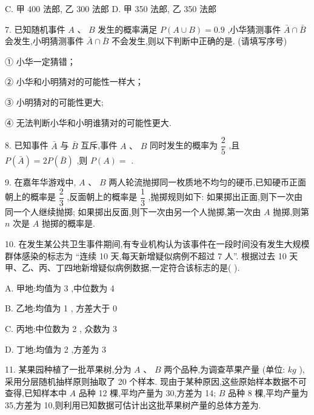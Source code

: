 C. 甲 400 法郎, 乙 300 法郎 D. 甲 350 法郎, 乙 350 法郎

7. 已知随机事件 $A\text{ 、 }B$ 发生的概率满足 $P\left( {A \cup  B}\right)  = {0.9}$ ,小华猜测事件 $\bar{A} \cap  \bar{B}$ 会发生,小明猜测事件 $\bar{A} \cap  \bar{B}$ 不会发生,则以下判断中正确的是\blkda{}. (请填写序号)

① 小华一定猜错；

② 小华和小明猜对的可能性一样大；

③ 小明猜对的可能性更大;

④ 无法判断小华和小明谁猜对的可能性更大.

8. 已知事件 $\bar{A}$ 与 $\bar{B}$ 互斥,事件 $A\text{ 、 }B$ 同时发生的概率为 $\dfrac{2}{5}$ ,且 $P\left( \bar{A}\right)  = {2P}\left( \bar{B}\right)$ ,则 $P\left( A\right)  =$ \blkda{}.

9. 在嘉年华游戏中, $A\text{ 、 }B$ 两人轮流抛掷同一枚质地不均匀的硬币,已知硬币正面朝上的概率是 $\dfrac{2}{3}$ ,反面朝上的概率是 $\dfrac{1}{3}$ ,抛掷规则如下: 如果掷出正面,则下一次由同一个人继续抛掷; 如果掷出反面,则下一次由另一个人抛掷,第一次由 $A$ 抛掷,则第 $n$ 次是 $A$ 抛掷的概率是\blkda{}.

10. 在发生某公共卫生事件期间,有专业机构认为该事件在一段时间没有发生大规模群体感染的标志为 “连续 10 天,每天新增疑似病例不超过 7 人”. 根据过去 10 天甲、乙、丙、丁四地新增疑似病例数据,一定符合该标志的是(   ).

A. 甲地:均值为 3 ,中位数为 4

B. 乙地:均值为 1 , 方差大于 0

C. 丙地:中位数为 2 , 众数为 3

D. 丁地:均值为 2 ,方差为 3

11. 某果园种植了一批苹果树,分为 $A\text{ 、 }B$ 两个品种,为调查苹果产量 (单位: ${{kg}}$ ),采用分层随机抽样原则抽取了 20 个样本. 现由于某种原因,这些原始样本数据不可查得,已知样本中 $A$ 品种 12 棵,平均产量为 30,方差为 14; $B$ 品种 8 棵,平均产量为 35,方差为 10,则利用已知数据可估计出这批苹果树产量的总体方差为\blkda{}.